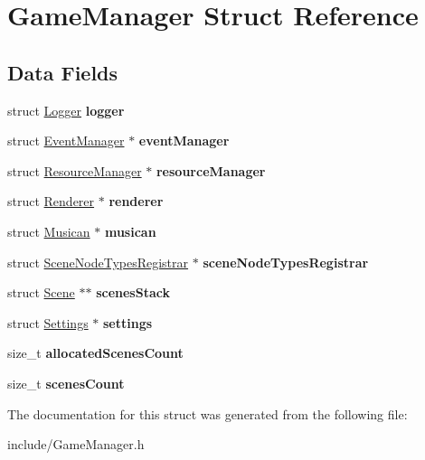 \hypertarget{struct_game_manager}{}\section{Game\+Manager Struct Reference}
\label{struct_game_manager}
\subsection*{Data Fields}
\begin{DoxyCompactItemize}
\item 
\hypertarget{struct_game_manager_a7a4db212ea06ad60af39668b7e267adc}{}\label{struct_game_manager_a7a4db212ea06ad60af39668b7e267adc} 
struct \hyperlink{struct_logger}{Logger} {\bfseries logger}
\item 
\hypertarget{struct_game_manager_a0271577c2a84bcbcd2e51bcea2e50506}{}\label{struct_game_manager_a0271577c2a84bcbcd2e51bcea2e50506} 
struct \hyperlink{struct_event_manager}{Event\+Manager} $\ast$ {\bfseries event\+Manager}
\item 
\hypertarget{struct_game_manager_a93fdfea6f603cf523a678110e9179ab1}{}\label{struct_game_manager_a93fdfea6f603cf523a678110e9179ab1} 
struct \hyperlink{struct_resource_manager}{Resource\+Manager} $\ast$ {\bfseries resource\+Manager}
\item 
\hypertarget{struct_game_manager_a7408e04e761a481eee003a02425d99b6}{}\label{struct_game_manager_a7408e04e761a481eee003a02425d99b6} 
struct \hyperlink{struct_renderer}{Renderer} $\ast$ {\bfseries renderer}
\item 
\hypertarget{struct_game_manager_a106db72962d8e9542c1662085e26950a}{}\label{struct_game_manager_a106db72962d8e9542c1662085e26950a} 
struct \hyperlink{struct_musican}{Musican} $\ast$ {\bfseries musican}
\item 
\hypertarget{struct_game_manager_a3ab0b6f9ff843ee538fa32b3fc03ce44}{}\label{struct_game_manager_a3ab0b6f9ff843ee538fa32b3fc03ce44} 
struct \hyperlink{struct_scene_node_types_registrar}{Scene\+Node\+Types\+Registrar} $\ast$ {\bfseries scene\+Node\+Types\+Registrar}
\item 
\hypertarget{struct_game_manager_ab38a16090655f6b9ad92d601ba0d4777}{}\label{struct_game_manager_ab38a16090655f6b9ad92d601ba0d4777} 
struct \hyperlink{struct_scene}{Scene} $\ast$$\ast$ {\bfseries scenes\+Stack}
\item 
\hypertarget{struct_game_manager_a10fc65a0d15969d43d61d98b924beabb}{}\label{struct_game_manager_a10fc65a0d15969d43d61d98b924beabb} 
struct \hyperlink{struct_settings}{Settings} $\ast$ {\bfseries settings}
\item 
\hypertarget{struct_game_manager_a56f24315504445ab6006dde1c656145f}{}\label{struct_game_manager_a56f24315504445ab6006dde1c656145f} 
size\+\_\+t {\bfseries allocated\+Scenes\+Count}
\item 
\hypertarget{struct_game_manager_ab0af7f842ec3b7e323852a9fbd8a2b2f}{}\label{struct_game_manager_ab0af7f842ec3b7e323852a9fbd8a2b2f} 
size\+\_\+t {\bfseries scenes\+Count}
\end{DoxyCompactItemize}


The documentation for this struct was generated from the following file\+:\begin{DoxyCompactItemize}
\item 
include/Game\+Manager.\+h\end{DoxyCompactItemize}
